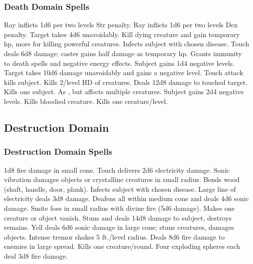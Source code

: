 \subsubsection{Death Domain Spells}
\begin{spelllist}
 Ray inflicts 1d6  per two levels Str penalty.
 Ray inflicts 1d6  per two levels Dex penalty.
 Target takes 4d6 unavoidably.
 Kill dying creature and gain temporary hp, more for killing powerful creatures.
 Infects subject with chosen disease.
 Touch deals 6d8 damage; caster gains half damage as temporary hp.
 Grants immunity to death spells and negative energy effects.
 Subject gains 1d4 negative levels.
 Target takes 10d6 damage unavoidably and gains a negative level.
 Touch attack kills subject.
\M Kills 2/level HD of creatures.
 Deals 12d8 damage to touched target.
 Kills one subject.
\spellhead[7]{} 
 As , but affects multiple creatures.
 Subject gains 2d4 negative levels.
 Kills bloodied creature.
 Kills one creature/level.
\end{spelllist}

\subsection{Destruction Domain}

\subsubsection{Destruction Domain Spells}
\begin{spelllist}
 1d8 fire damage in small cone.
 Touch delivers 2d6 electricity damage.
 Sonic vibration damages objects or crystalline creatures in small radius.
 Bends wood (shaft, handle, door, plank).
 Infects subject with chosen disease.
 Large line of electricity deals 3d8 damage.
 Deafens all within medium cone and deals 4d6 sonic damage.
\spellhead[4]{}
 Smite foes in small radius with divine fire (5d6 damage).
\spellhead[5]{}
 Makes one creature or object vanish.
\F Stuns and deals 14d8 damage to subject, destroys remains.
 Yell deals 6d6 sonic damage in large cone; stuns creatures, damages objects.
 Intense tremor shakes 5 ft./level radius.
 Deals 8d6 fire damage to enemies in large spread.
 Kills one creature/round.
 Four exploding spheres each deal 3d8 fire damage.
\end{spelllist}

